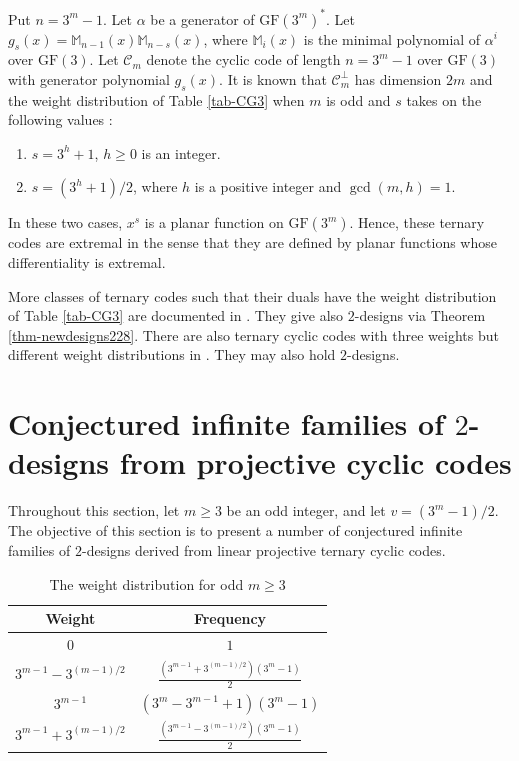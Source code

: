 \documentclass[1p,final]{elsarticle}
\newcommand{\gf}{{\mathrm{GF}}}
\newcommand{\m}{\mathbb{M}}
\newcommand{\C}{{\mathcal{C}}}
\begin{document}
Put $n=3^m-1$. 
Let $\alpha$ be a generator of $\gf(3^m)^*$. Let $g_s(x)=\m_{n-1}(x)\m_{n-s}(x)$, where $\m_i(x)$ 
is the minimal polynomial of $\alpha^i$ over $\gf(3)$. Let $\C_m$ denote the cyclic code of length
$n=3^m-1$ over $\gf(3)$ with generator polynomial $g_s(x)$. It is known that $\C_m^\perp$ has 
dimension $2m$ and the weight distribution of Table \ref{tab-CG3} when $m$ is odd and $s$ takes on the
following values \cite{CDY,YCD}:
\begin{enumerate}
\item $s=3^h+1$, $h \geq 0$ is an integer.
\item $s=(3^h + 1)/2$, where $h$ is a positive integer and $\gcd(m, h)=1$.
\end{enumerate}
In these two cases, $x^s$ is a planar function on $\gf(3^m)$. Hence, these ternary codes are 
extremal in the sense that they are defined by planar functions whose differentiality is 
extremal. 

More classes of ternary codes such that their duals have the weight distribution 
of  Table \ref{tab-CG3} are documented in \cite{DLLZ}. They give also $2$-designs 
via Theorem \ref{thm-newdesigns228}. There are also ternary cyclic codes with three weights 
but different weight distributions in \cite{DLLZ}. They may also hold $2$-designs.   







\section{Conjectured infinite families of $2$-designs from projective cyclic codes}\label{sec-conjectureddesigns}

Throughout this section, let $m \geq 3$ be an odd integer, and let $v=(3^m-1)/2$. The objective of 
this section is to present a number of conjectured infinite families of $2$-designs derived from 
linear projective ternary cyclic codes.  


\begin{table}
\begin{center}
\caption{The weight distribution for odd  $m \ge3$}\label{Tab-GG2}
\begin{tabular}{|c|c|}
\hline
Weight  &  Frequency \\ \hline
$0$     &  $1$ \\ \hline
$3^{m-1}-3^{(m-1)/2}$ & $\frac{(3^{m-1}+3^{(m-1)/2})(3^m-1)}{2}$ \\ \hline
$3^{m-1}$ & $(3^m-3^{m-1}+1)(3^m-1)$ \\ \hline
$3^{m-1}+3^{(m-1)/2}$ & $\frac{(3^{m-1}-3^{(m-1)/2})(3^m-1)}{2}$ \\ \hline
\end{tabular}
\label{table4}
\end{center}
\end{table}
\end{document}
